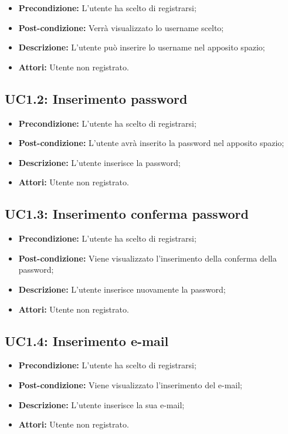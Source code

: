 \begin{itemize}
	\item \textbf{Precondizione:} L'utente ha scelto di registrarsi;
	\item \textbf{Post-condizione:} Verrà visualizzato lo username scelto;
	\item \textbf{Descrizione:} L'utente può inserire lo username nel apposito spazio;
	\item \textbf{Attori:} Utente non registrato.
\end{itemize}
\subsection{ UC1.2: Inserimento password}

\begin{itemize}
	\item \textbf{Precondizione:} L'utente ha scelto di registrarsi;
	\item \textbf{Post-condizione:} L'utente avrà inserito la password nel apposito spazio;
	\item \textbf{Descrizione:} L'utente inserisce la password;
	\item \textbf{Attori:} Utente non registrato.
\end{itemize}
\subsection{ UC1.3: Inserimento conferma password}

\begin{itemize}
	\item \textbf{Precondizione:} L'utente ha scelto di registrarsi;
	\item \textbf{Post-condizione:} Viene visualizzato l'inserimento della conferma della password;
	\item \textbf{Descrizione:} L'utente inserisce nuovamente la password;
	\item \textbf{Attori:} Utente non registrato.
\end{itemize}
\subsection{ UC1.4: Inserimento e-mail}

\begin{itemize}
	\item \textbf{Precondizione:} L'utente ha scelto di registrarsi;
	\item \textbf{Post-condizione:} Viene visualizzato l'inserimento del e-mail;
	\item \textbf{Descrizione:} L'utente inserisce la sua e-mail;
	\item \textbf{Attori:} Utente non registrato.
\end{itemize}

